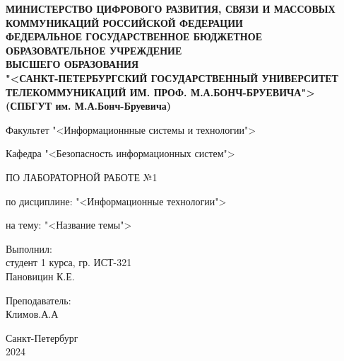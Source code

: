 \documentclass[a4paper]{article}
\begin{document}
\setmainfont{Times New Roman}
\begin{titlepage}
\begin{center}
\textbf{МИНИСТЕРСТВО ЦИФРОВОГО РАЗВИТИЯ, СВЯЗИ И МАССОВЫХ КОММУНИКАЦИЙ РОССИЙСКОЙ ФЕДЕРАЦИИ \\
ФЕДЕРАЛЬНОЕ ГОСУДАРСТВЕННОЕ БЮДЖЕТНОЕ ОБРАЗОВАТЕЛЬНОЕ УЧРЕЖДЕНИЕ \\
ВЫСШЕГО ОБРАЗОВАНИЯ \\
"<САНКТ-ПЕТЕРБУРГСКИЙ ГОСУДАРСТВЕННЫЙ УНИВЕРСИТЕТ ТЕЛЕКОММУНИКАЦИЙ ИМ. ПРОФ. М.А.БОНЧ-БРУЕВИЧА"> \\
(СПБГУТ им. М.А.Бонч-Бруевича)}

\centerline{\hfill\hrulefill\hrulefill\hfill}

\vfill

Факультет "<Информационнные системы и технологии">

Кафедра "<Безопасность информационных систем">

\vfill

\large{ ПО ЛАБОРАТОРНОЙ РАБОТЕ №1}

по дисциплине: "<Информационные технологии">

на тему: "<Название темы">

\end{center}

\vfill


\begin{flushright}
Выполнил: \\
студент 1 курса, гр. ИСТ-321 \\
Пановицин К.Е. 

\bigskip
Преподаватель: \\ 
Климов.А.А
\end{flushright}

\vfill
\vfill

\begin{center}

Санкт-Петербург \\
2024
\thispagestyle{empty}
\end{center}
\end{titlepage}
\setcounter{page}{2}
\end{document}
